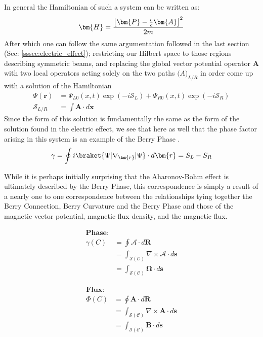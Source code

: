 \documentclass{article}
\begin{document}
In general the Hamiltonian of such a system can be written as:
\begin{equation*}
  \bm{H} = \frac{\left[ \bm{P} - \frac{e}{c}\bm{A} \right]^{2}}{2m} \\
\end{equation*}
After which one can follow the same argumentation followed in the last section (Sec: \ref{sssec:electric_effect}); restricting our Hilbert space to those regions describing symmetric beams, and replacing the global vector potential operator $\bm{A}$ with two local operators acting solely on the two paths $\bm(A)_{L/R}$ in order come up with a solution of the Hamiltonian
\begin{align*}
  \Psi(\bm{r})&=\Psi_{L0}(x,t)\exp(-i \mathcal{S}_{L}) + \Psi_{R0}(x,t)\exp(-i \mathcal{S}_{R})\\
  \mathcal{S}_{L/R} &= \int \bm{A} \cdot d\bm{x} 
\end{align*}
Since the form of this solution is fundamentally the same as the form of the solution found in the electric effect, we see that here as well that the phase factor arising in this system is an example of the Berry Phase \cite{Aharonov1959}.
  \begin{equation*}
    \gamma = \oint i\braket{\Psi|\nabla_{\bm{r}}|\Psi} \cdot d\bm{r} = S_{L} - S_{R}
  \end{equation*}

While it is perhaps initially surprising that the Aharonov-Bohm effect is ultimately described by the Berry Phase, this correspondence is simply a result of a nearly one to one correspondence between the relationships tying together the Berry Connection, Berry Curvature and the Berry Phase and those of the magnetic vector potential, magnetic flux density, and the magnetic flux.

    \begin{minipage}{0.4\textwidth}
       \begin{align*}
         \textbf{Phase:}&\\
         \gamma(C) &= \oint \bm{\mathcal{A}} \cdot d\bm{R} \\
                   &= \int_{\mathcal{S}(\mathcal{C})} 
                      \nabla \times \bm{\mathcal{A}} \cdot d\bm{s}\\
                   &= \int_{\mathcal{S}(\mathcal{C})} \bm{\Omega} \cdot d\bm{s}
       \end{align*}
    \end{minipage}
    \hspace{0.05\textwidth}
    \begin{minipage}{0.4\textwidth}
      \begin{align*}
        \textbf{Flux:}&\\
        \Phi(C) &= \oint \bm{A} \cdot d\bm{R} \\
                &= \int_{\mathcal{S}(\mathcal{C})}
                   \nabla \times \bm{A} \cdot d\bm{s} \\
                &= \int_{\mathcal{S}(\mathcal{C})} \bm{B} \cdot d\bm{s}
      \end{align*}
    \end{minipage}\\
\end{document}
